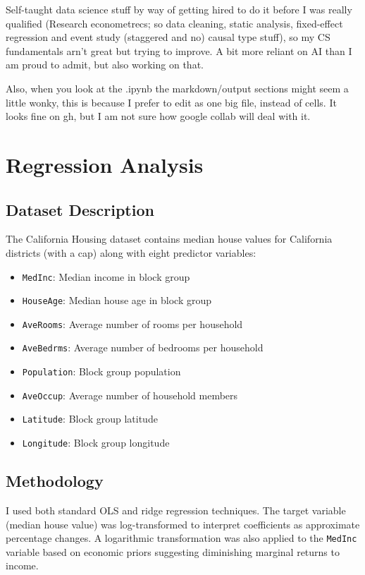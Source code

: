 \documentclass[letterpaper, 11pt]{amsart}
\begin{document}
\medskip

 Self-taught data science stuff by way of getting hired to do it before I was really qualified (Research econometrecs; so data cleaning, static analysis, fixed-effect regression and event study (staggered and no) causal type stuff), so my CS fundamentals arn't great but trying to improve.
A bit more reliant on AI than I am proud to admit, but also working on that.

Also, when you look at the .ipynb the markdown/output sections might seem a little wonky, this is because I prefer to edit as one big file, instead of cells. It looks fine on gh, but I am not sure how google collab will deal with it.

\section{Regression Analysis}

\subsection{Dataset Description}
The California Housing dataset contains median house values for California districts (with a cap) along with eight predictor variables:
\begin{itemize}
    \item \texttt{MedInc}: Median income in block group
    \item \texttt{HouseAge}: Median house age in block group
    \item \texttt{AveRooms}: Average number of rooms per household
    \item \texttt{AveBedrms}: Average number of bedrooms per household
    \item \texttt{Population}: Block group population
    \item \texttt{AveOccup}: Average number of household members
    \item \texttt{Latitude}: Block group latitude
    \item \texttt{Longitude}: Block group longitude
\end{itemize}

\subsection{Methodology}
I used both standard OLS and ridge regression techniques. The target variable (median house value) was log-transformed to interpret coefficients as approximate percentage changes. A logarithmic transformation was also applied to the \texttt{MedInc} variable based on economic priors suggesting diminishing marginal returns to income.
\end{document}
